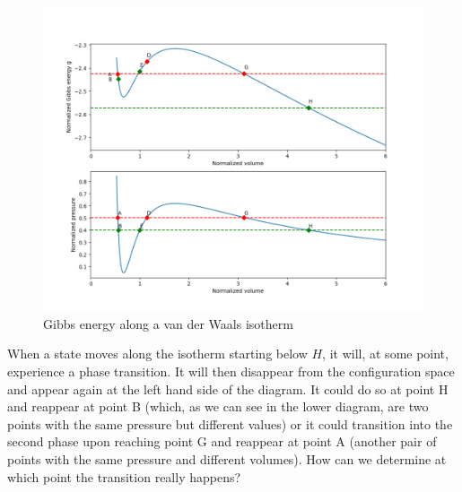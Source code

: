 \documentclass[a4paper, draft]{article}
\theoremstyle{own}
\theoremstyle{remark}
\begin{document}
\begin{figure}[ht]
\centering
\includegraphics[scale=0.5]{VanDerWaalsMaxwell}
\caption{Gibbs energy along a van der Waals isotherm}
\label{fig:VanDerWaalsMaxwell}
\end{figure}

When a state moves along the isotherm starting below $H$, it will, at some point, experience a phase transition. It will then disappear from the configuration space and appear again at the left hand side of the diagram. It could do so at point H and reappear at point 
B (which, as we can see in the lower diagram, are two points with the same pressure but different values) or it could transition into the second phase upon reaching point G and reappear at point A (another pair of points with the same pressure and different volumes). How can we determine at which point the transition really happens?
\end{document}
